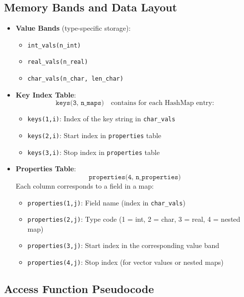 \documentclass{article}
\begin{document}
\subsection{Memory Bands and Data Layout}

\begin{itemize}
  \item \textbf{Value Bands} (type-specific storage):
    \begin{itemize}
      \item \texttt{int\_vals(n\_int)}
      \item \texttt{real\_vals(n\_real)}
      \item \texttt{char\_vals(n\_char, len\_char)}
    \end{itemize}

  \item \textbf{Key Index Table}:
    \[
    \texttt{keys(3, n\_maps)} \quad \text{contains for each HashMap entry:}
    \]
    \begin{itemize}
      \item \texttt{keys(1,i)}: Index of the key string in \texttt{char\_vals}
      \item \texttt{keys(2,i)}: Start index in \texttt{properties} table
      \item \texttt{keys(3,i)}: Stop index in \texttt{properties} table
    \end{itemize}

  \item \textbf{Properties Table}:
    \[
    \texttt{properties(4, n\_properties)}
    \]
    Each column corresponds to a field in a map:
    \begin{itemize}
      \item \texttt{properties(1,j)}: Field name (index in \texttt{char\_vals})
      \item \texttt{properties(2,j)}: Type code (1 = int, 2 = char, 3 = real, 4 = nested map)
      \item \texttt{properties(3,j)}: Start index in the corresponding value band
      \item \texttt{properties(4,j)}: Stop index (for vector values or nested maps)
    \end{itemize}
\end{itemize}

\subsection{Access Function Pseudocode}
\end{document}
